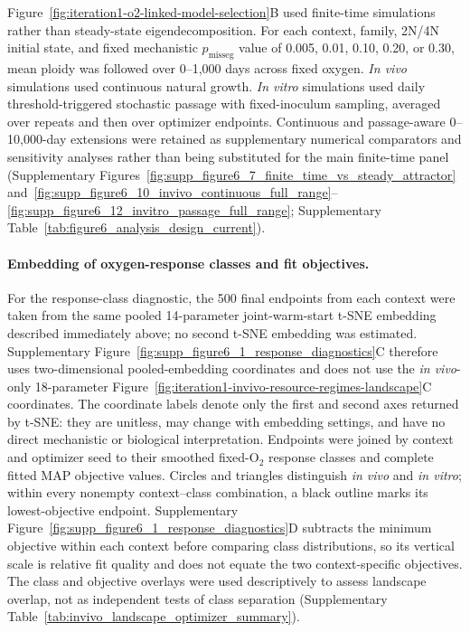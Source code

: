 \documentclass[11pt]{article}
\begin{document}
Figure~\ref{fig:iteration1-o2-linked-model-selection}B used finite-time simulations rather than steady-state eigendecomposition. For each context, family, 2N/4N initial state, and fixed mechanistic $p_{\mathrm{misseg}}$ value of 0.005, 0.01, 0.10, 0.20, or 0.30, mean ploidy was followed over 0--1,000 days across fixed oxygen. \textit{In vivo} simulations used continuous natural growth. \textit{In vitro} simulations used daily threshold-triggered stochastic passage with fixed-inoculum sampling, averaged over repeats and then over optimizer endpoints. Continuous and passage-aware 0--10,000-day extensions were retained as supplementary numerical comparators and sensitivity analyses rather than being substituted for the main finite-time panel (Supplementary Figures~\ref{fig:supp_figure6_7_finite_time_vs_steady_attractor} and~\ref{fig:supp_figure6_10_invivo_continuous_full_range}--\ref{fig:supp_figure6_12_invitro_passage_full_range}; Supplementary Table~\ref{tab:figure6_analysis_design_current}).

\paragraph{Embedding of oxygen-response classes and fit objectives.}
For the response-class diagnostic, the 500 final endpoints from each context were taken from the same pooled 14-parameter joint-warm-start t-SNE embedding described immediately above; no second t-SNE embedding was estimated. Supplementary Figure~\ref{fig:supp_figure6_1_response_diagnostics}C therefore uses two-dimensional pooled-embedding coordinates and does not use the \textit{in vivo}-only 18-parameter Figure~\ref{fig:iteration1-invivo-resource-regimes-landscape}C coordinates. The coordinate labels denote only the first and second axes returned by t-SNE: they are unitless, may change with embedding settings, and have no direct mechanistic or biological interpretation. Endpoints were joined by context and optimizer seed to their smoothed fixed-O$_2$ response classes and complete fitted MAP objective values. Circles and triangles distinguish \textit{in vivo} and \textit{in vitro}; within every nonempty context--class combination, a black outline marks its lowest-objective endpoint. Supplementary Figure~\ref{fig:supp_figure6_1_response_diagnostics}D subtracts the minimum objective within each context before comparing class distributions, so its vertical scale is relative fit quality and does not equate the two context-specific objectives. The class and objective overlays were used descriptively to assess landscape overlap, not as independent tests of class separation (Supplementary Table~\ref{tab:invivo_landscape_optimizer_summary}).
\end{document}
